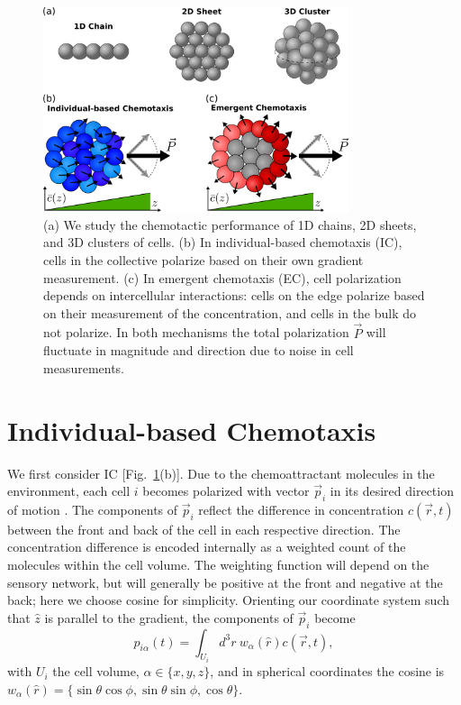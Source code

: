 \begin{figure}
    \centering
        \includegraphics[width=0.8\textwidth]{../fig/ch3_fig1.png}
    \caption{(a) We study the chemotactic performance of 1D chains, 2D sheets, and 3D clusters of cells. (b) In individual-based chemotaxis (IC), cells in the collective polarize based on their own gradient measurement. (c) In emergent chemotaxis (EC), cell polarization depends on intercellular interactions: cells on the edge polarize based on their measurement of the concentration, and cells in the bulk do not polarize. In both mechanisms the total polarization $\vec{P}$ will fluctuate in magnitude and direction due to noise in cell measurements.} \label{fig:ch3_1}
\end{figure}


\section{Individual-based Chemotaxis}

We first consider IC [Fig.\ \ref{fig:ch3_1}(b)]. Due to the chemoattractant molecules in the environment, each cell $i$ becomes polarized with vector $\vec{p}_i$ in its desired direction of motion \cite{jilkine2011comparison}. The components of $\vec{p}_i$ reflect the difference in concentration $c(\vec{r},t)$ between the front and back of the cell in each respective direction.
The concentration difference is encoded internally as a weighted count of the molecules within the cell volume. The weighting function will depend on the sensory network, but will generally be positive at the front and negative at the back; here we choose cosine for simplicity. Orienting our coordinate system such that $\hat{z}$ is parallel to the gradient, the components of $\vec{p}_i$ become
\begin{equation}
    p_{i\alpha}(t) = \int_{U_i} d^3r \ w_\alpha(\hat{r}) c(\vec{r},t) , \label{eq:ICcell}
\end{equation}
with $U_i$ the cell volume, $\alpha\in\{x,y,z\}$, and in spherical coordinates the cosine is $w_\alpha(\hat{r}) = \{\sin\theta \cos\phi, \sin\theta \sin\phi, \cos\theta\}$.

